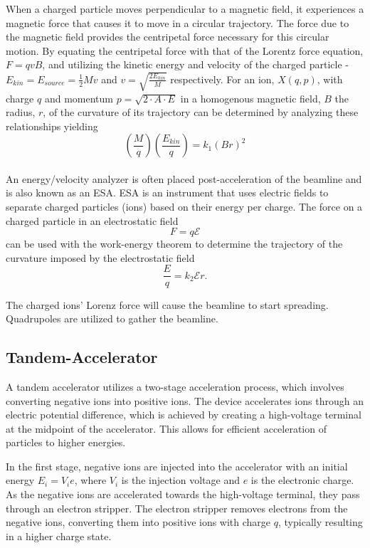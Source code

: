 When a charged particle moves perpendicular to a magnetic field, it experiences a magnetic force that causes it to move in a circular trajectory. The force due to the magnetic field provides the centripetal force necessary for this circular motion. By equating the centripetal force with that of the Lorentz force equation, $F = qvB$, and utilizing the kinetic energy and velocity of the charged particle - $E_{kin}=E_{source}=\frac{1}{2}Mv$ and $v=\sqrt{\frac{2E_{kin}}{M}}$ respectively. For an ion, $X(q,p)$, with charge $q$ and momentum $p = \sqrt{2\cdot A \cdot E}$ in a homogenous magnetic field, $B$ the radius, $r$, of the curvature of its trajectory can be determined by analyzing these relationships yielding
\begin{equation}
    \left(\dfrac{M}{q}\right)\left(\dfrac{E_{kin}}{q}\right)=k_{1}(Br)^{2}
    \label{magnetrigitidy}
\end{equation}\\

An energy/velocity analyzer is often placed post-acceleration of the beamline and is also known as an ESA. ESA is an instrument that uses electric fields to separate charged
particles (ions) based on their energy per charge. The force on a charged particle in an electrostatic field 
\begin{equation}
    F = q  \mathcal{E}
\end{equation}
can be used with the work-energy theorem to determine the trajectory of the curvature imposed by the electrostatic field
\begin{equation}
    \dfrac{E}{q} = k_{2}\mathcal{E}r.
    \label{electricrigitidy}
\end{equation}

The charged ions' Lorenz force will cause the beamline to start spreading. Quadrupoles are utilized to gather the beamline.



\subsection{Tandem-Accelerator}
A tandem accelerator utilizes a two-stage acceleration process, which involves converting negative ions into positive ions. The device accelerates ions through an electric potential difference, which is achieved by creating a high-voltage terminal at the midpoint of the accelerator. This allows for efficient acceleration of particles to higher energies.

In the first stage, negative ions are injected into the accelerator with an initial energy $E_i = V_i e$, where $V_i$ is the injection voltage and $e$ is the electronic charge. As the negative ions are accelerated towards the high-voltage terminal, they pass through an electron stripper. The electron stripper removes electrons from the negative ions, converting them into positive ions with charge $q$, typically resulting in a higher charge state.

